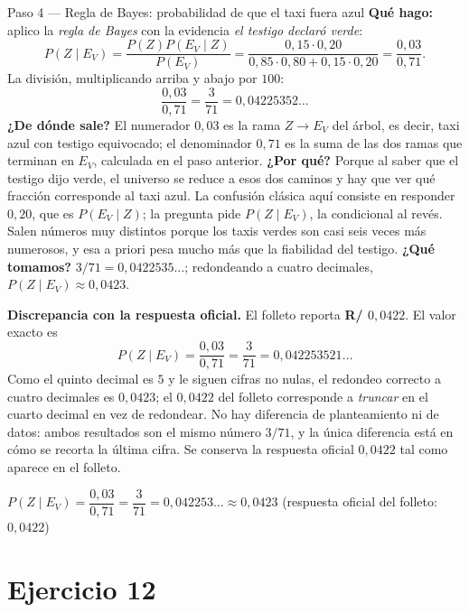 \documentclass[11pt]{article}
\begin{document}
\begin{sol}
\begin{paso}{Paso 4 --- Regla de Bayes: probabilidad de que el taxi fuera azul}
\textbf{Qué hago:} aplico la \emph{regla de Bayes} con la evidencia \emph{el testigo declaró verde}:
\[
P(Z\mid E_V)=\frac{P(Z)P(E_V\mid Z)}{P(E_V)}=\frac{0,15\cdot 0,20}{0,85\cdot 0,80+0,15\cdot 0,20}=\frac{0,03}{0,71}.
\]
La división, multiplicando arriba y abajo por $100$:
\[
\frac{0,03}{0,71}=\frac{3}{71}=0,04225352\ldots
\]
\textbf{¿De dónde sale?} El numerador $0,03$ es la rama $Z\to E_V$ del árbol, es decir, taxi azul con testigo equivocado; el denominador $0,71$ es la suma de las dos ramas que terminan en $E_V$, calculada en el paso anterior.
\textbf{¿Por qué?} Porque al saber que el testigo dijo verde, el universo se reduce a esos dos caminos y hay que ver qué fracción corresponde al taxi azul. La confusión clásica aquí consiste en responder $0,20$, que es $P(E_V\mid Z)$; la pregunta pide $P(Z\mid E_V)$, la condicional al revés. Salen números muy distintos porque los taxis verdes son casi seis veces más numerosos, y esa a priori pesa mucho más que la fiabilidad del testigo.
\textbf{¿Qué tomamos?} $3/71=0,0422535\ldots$; redondeando a cuatro decimales, $P(Z\mid E_V)\approx 0,0423$.
\end{paso}

\begin{nota}
\textbf{Discrepancia con la respuesta oficial.} El folleto reporta \textbf{R/ $0,0422$}. El valor exacto es
\[
P(Z\mid E_V)=\frac{0,03}{0,71}=\frac{3}{71}=0,042253521\ldots
\]
Como el quinto decimal es $5$ y le siguen cifras no nulas, el redondeo correcto a cuatro decimales es $0,0423$; el $0,0422$ del folleto corresponde a \emph{truncar} en el cuarto decimal en vez de redondear. No hay diferencia de planteamiento ni de datos: ambos resultados son el mismo número $3/71$, y la única diferencia está en cómo se recorta la última cifra. Se conserva la respuesta oficial $0,0422$ tal como aparece en el folleto.
\end{nota}

\begin{resp}
$P(Z\mid E_V)=\dfrac{0,03}{0,71}=\dfrac{3}{71}=0,042253\ldots\approx 0,0423$ \quad (respuesta oficial del folleto: $0,0422$)
\end{resp}

\end{sol}

\newpage
\section*{Ejercicio 12}
\end{document}
